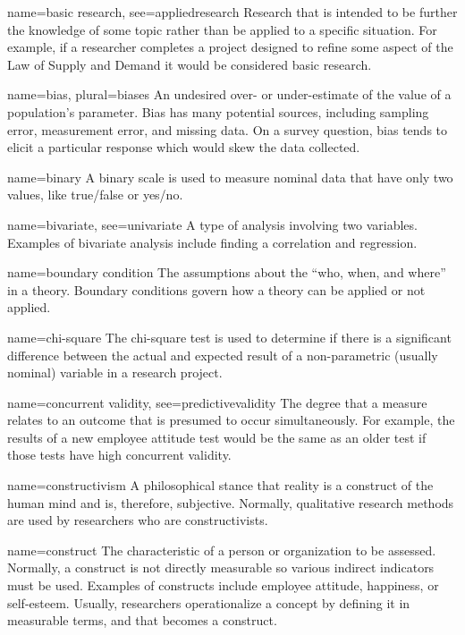 {name={basic research},
	see={appliedresearch}}
{%
	Research that is intended to be further the knowledge of some topic rather than be applied to a specific situation. For example, if a researcher completes a project designed to refine some aspect of the Law of Supply and Demand it would be considered basic research.  
}

{name={bias},
 plural={biases}}
{%
	An undesired over- or under-estimate of the value of a population's parameter. Bias has many potential sources, including sampling error, measurement error, and missing data. On a survey question, bias tends to elicit a particular response which would skew the data collected.
}

{name={binary}}
{%
	A binary scale is used to measure nominal data that have only two values, like true/false or yes/no.
}

{name={bivariate},
	see={univariate}}
{%
	A type of analysis involving two variables. Examples of bivariate analysis include finding a correlation and regression.
}

{name={boundary condition}}
{%
	The assumptions about the ``who, when, and where'' in a theory. Boundary conditions govern how a theory can be applied or not applied.
}

{name={chi-square}}
{%
	The chi-square test is used to determine if there is a significant difference between the actual and expected result of a non-parametric (usually nominal) variable in a research project.
}

{name={concurrent validity},
	see={predictivevalidity}}
{%
	The degree that a measure relates to an outcome that is presumed to occur simultaneously. For example, the results of a new employee attitude test would be the same as an older test if those tests have high concurrent validity.
}

{name={constructivism}}
{%
	A philosophical stance that reality is a construct of the human mind and is, therefore, subjective. Normally, qualitative research methods are used by researchers who are constructivists.
}

{name={construct}}
{%
	The characteristic of a person or organization to be assessed. Normally, a construct is not directly measurable so various indirect indicators must be used. Examples of constructs include employee attitude, happiness, or self-esteem. Usually, researchers operationalize a concept by defining it in measurable terms, and that becomes a construct.
}

